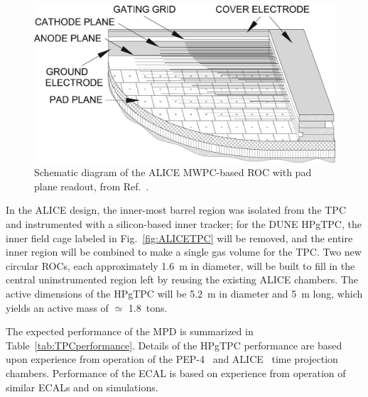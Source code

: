 \begin{figure}[h]
    \centering
    \includegraphics{graphics/TPC_ROC_MWPC.jpg}
    \caption{Schematic diagram of the ALICE MWPC-based ROC with pad plane readout, from Ref.~\cite{Alme:2010ke}.}
    \label{fig:ALICE_ROC_MWPC}
\end{figure}

In the ALICE design, the inner-most barrel region was isolated from the TPC and instrumented with a silicon-based inner tracker; for the DUNE HPgTPC, the inner field cage labeled in Fig.~\ref{fig:ALICETPC} will be removed, and the entire inner region will be combined to make a single gas volume for the TPC. Two new circular ROCs, each approximately 1.6~m in diameter, will be built to fill in the central uninstrumented region left by reusing the existing ALICE chambers.  The active dimensions of the HPgTPC will be 5.2~m in diameter and 5~m long, which yields an active mass of $\simeq$ 1.8~tons. 

The expected performance of the MPD is summarized in Table~\ref{tab:TPCperformance}. Details of the HPgTPC performance are based upon experience from operation of the PEP-4~\cite{PEP4_results_Layter,PEP4_Stork,Madaras:1982cj} and ALICE~\cite{Alessandro:2006yt} time projection chambers. Performance of the ECAL is based on experience from operation of similar ECALs and on simulations. 

